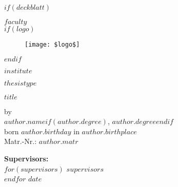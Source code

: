 \documentclass[oneside,12pt,a4paper,bibliography=totocnumbered,numbers=noenddot,table]{scrreprt}
\begin{document}

$if(deckblatt)$
\begin{titlepage}
\thispagestyle{empty}
\begin{center}

\textsf{\textbf{$faculty$}}\\

$if(logo)$
\begin{figure}[h!]
    \centering
    \texttt{[image: \$logo\$]}
\end{figure}
$endif$

\textsf{\textbf{$institute$}}\\[1,0cm]

\begin{Large}
    \textsf{\textbf{$thesistype$}}\\[0,75cm]
\end{Large}

\begin{LARGE}
    \textsf{\textbf{$title$}}\\[1,5cm]
\end{LARGE}

\begin{large}
    \textsf{by}\\[0,1cm]
    \textsf{\textbf{$author.name$}$if(author.degree)$, $author.degree$$endif$}\\[0,1cm]
    \textsf{born $author.birthday$ in $author.birthplace$}\\[0,1cm]
    \textsf{Matr.-Nr.: $author.matr$}\\[1,5cm]
\end{large}

\begin{large}
    \textbf{Supervisors:}\\[0,3cm]
    $for(supervisors)$
    \textsf{$supervisors$}\\[0,3cm]
    $endfor$
    \vspace{1cm}
    \textsf{$date$}\\
\end{large}

\end{center}

\end{titlepage}
\thispagestyle{empty}
\cleardoublepage
\end{document}

